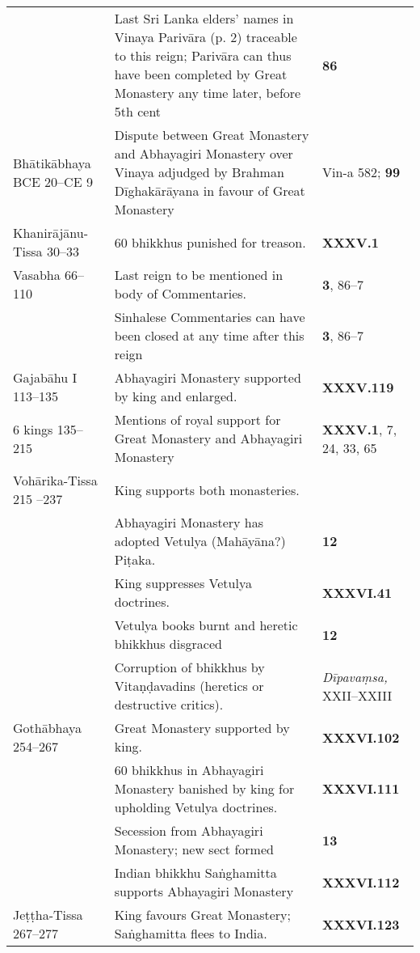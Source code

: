 \begin{tabular}{l|l|l}
     & Last Sri Lanka elders’ names in Vinaya Parivāra (p. 2) traceable to this reign; Parivāra can thus have been completed by Great Monastery any time later, before 5th cent   & \textbf{\cite{EHBC} 86}\\
    Bhātikābhaya BCE 20–CE 9 & Dispute between Great Monastery and Abhayagiri Monastery over Vinaya adjudged by Brahman Dīghakārāyana in favour of Great Monastery  & Vin-a 582; \textbf{\cite{EHBC} 99} \\
    Khanirājānu-Tissa 30–33 & 60 bhikkhus punished for treason. & \textbf{\cite{Mhv} XXXV.1}\\
    Vasabha  66–110   & Last reign to be mentioned in body of Commentaries.   & \textbf{\cite{EHBC} 3}, 86–7 \\
     & Sinhalese Commentaries can have been closed at any time after this reign & \textbf{\cite{EHBC} 3}, 86–7 \\
    Gajabāhu I  113–135   & Abhayagiri Monastery supported by king and enlarged.  & \textbf{\cite{Mhv} XXXV.119} \\
    6 kings  135–215   & Mentions of royal support for Great Monastery and Abhayagiri Monastery & \textbf{\cite{Mhv} XXXV.1}, 7, 24, 33, 65 \\
    Vohārika-Tissa 215 –237  & King supports both monasteries.  & \\
     & Abhayagiri Monastery has adopted Vetulya (Mahāyāna?) Piṭaka. & \textbf{\cite{Nikāya-s} 12}\\
     & King suppresses Vetulya doctrines. & \textbf{\cite{Mhv} XXXVI.41}\\
     & Vetulya books burnt and heretic bhikkhus disgraced   & \textbf{\cite{Nikāya-s} 12} \\
     & Corruption of bhikkhus by Vitaṇḍavadins (heretics or destructive critics).  & \emph{Dīpavaṃsa, }\textbf{\cite{Dīp}} XXII–XXIII\\
    Gothābhaya 254–267 & Great Monastery supported by king.  & \textbf{\cite{Mhv} XXXVI.102} \\
     & 60 bhikkhus in Abhayagiri Monastery banished by king for upholding Vetulya doctrines. & \textbf{\cite{Mhv} XXXVI.111}\\
     & Secession from Abhayagiri Monastery; new sect formed & \textbf{\cite{Nikāya-s} 13}\\
     & Indian bhikkhu Saṅghamitta supports Abhayagiri Monastery & \textbf{\cite{Mhv} XXXVI.112}\\
    Jeṭṭha-Tissa 267–277 & King favours Great Monastery; Saṅghamitta flees to India.  & \textbf{\cite{Mhv} XXXVI.123}  \\

\end{tabular}
